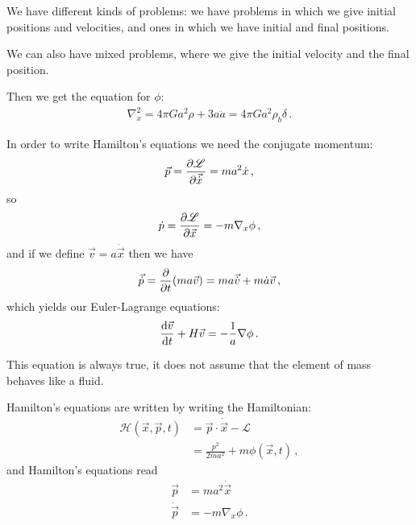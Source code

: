 \documentclass[main.tex]{subfiles}
\begin{document}
We have different kinds of problems: we have problems in which we give initial positions and velocities, and ones in which we have initial and final positions. 

We can also have mixed problems, where we give the initial velocity and the final position.


Then we get the equation for \(\phi \): 
%
\begin{align}
\nabla^2_{x} = 4 \pi G a^2 \rho + 3 a \ddot{a} = 4 \pi G a^2\rho_{b} \delta 
\,.
\end{align}

In order to write Hamilton's equations we need the conjugate momentum: 
%
\begin{align}
\vec{p} = \pdv{\mathscr{L}}{\vec{\dot{x}}} = m a^2 \dot{x}
\,,
\end{align}
%
so 
%
\begin{align}
\dot{p} = \pdv{\mathscr{L}}{\vec{x}} = - m \nabla_{x} \phi 
\,,
\end{align}
%
and if we define \(\vec{v} = a \dot{\vec{x}}\) then we have 
%
\begin{align}
\vec{\dot{p}} = \pdv{}{t} \qty(m a \vec{v}) = m a \vec{\dot{v}} + m \dot{a} \vec{v}
\,,
\end{align}
%
which yields our Euler-Lagrange equations: 
%
\begin{align}
\dv{\vec{v}}{t} + H \vec{v} = - \frac{1}{a} \nabla \phi 
\,.
\end{align}

This equation is always true, it does not assume that the element of mass behaves like a fluid. 

Hamilton's equations are written by writing the Hamiltonian: 
%
\begin{subequations}
\begin{align}
\mathscr{H}(\vec{x}, \vec{p}, t) &= \vec{p} \cdot \dot{\vec{x}} - \mathscr{L}   \\
&= \frac{p^2}{2 m a^2} + m \phi (\vec{x}, t)
\,,
\end{align}
\end{subequations}
%
and Hamilton's equations read 
%
\begin{subequations}
\begin{align}
\vec{p} &= m a^2 \dot{\vec{x}}  \\
\dot{\vec{p}} &= - m \nabla_{x} \phi 
\,.
\end{align}
\end{subequations}
\end{document}
